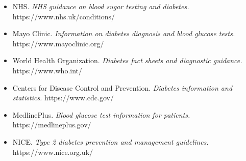 \begin{itemize}
    \item NHS. \textit{NHS guidance on blood sugar testing and diabetes.} https://www.nhs.uk/conditions/
    \item Mayo Clinic. \textit{Information on diabetes diagnosis and blood glucose tests.} https://www.mayoclinic.org/
    \item World Health Organization. \textit{Diabetes fact sheets and diagnostic guidance.} https://www.who.int/
    \item Centers for Disease Control and Prevention. \textit{Diabetes information and statistics.} https://www.cdc.gov/
    \item MedlinePlus. \textit{Blood glucose test information for patients.} https://medlineplus.gov/
    \item NICE. \textit{Type 2 diabetes prevention and management guidelines.} https://www.nice.org.uk/
\end{itemize}
